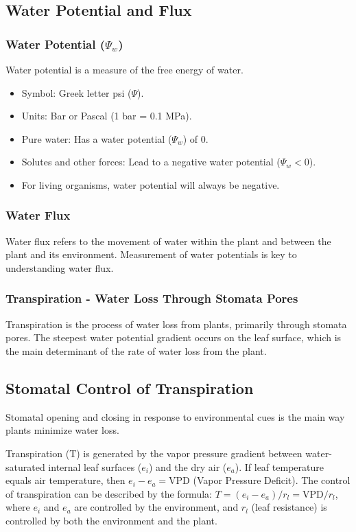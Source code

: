 \subsection{Water Potential and Flux} 
\subsubsection{Water Potential ($\Psi_w$)} 
Water potential is a measure of the free energy of water. 
\begin{itemize} 
    \item Symbol: Greek letter psi ($\Psi$). 
    \item Units: Bar or Pascal (1 bar = 0.1 MPa). 
    \item Pure water: Has a water potential ($\Psi_w$) of 0. 
    \item Solutes and other forces: Lead to a negative water potential ($\Psi_w < 0$). \item For living organisms, water potential will always be negative. 
\end{itemize}
\subsubsection{Water Flux} Water flux refers to the movement of water within the plant and between the plant and its environment. Measurement of water potentials is key to understanding water flux.

\subsubsection{Transpiration - Water Loss Through Stomata Pores} 
Transpiration is the process of water loss from plants, primarily through stomata pores. The steepest water potential gradient occurs on the leaf surface, which is the main determinant of the rate of water loss from the plant.

\subsection{Stomatal Control of Transpiration} 
Stomatal opening and closing in response to environmental cues is the main way plants minimize water loss. 

\vspace*{1em}
Transpiration (T) is generated by the vapor pressure gradient between water-saturated internal leaf surfaces ($e_i$) and the dry air ($e_a$). If leaf temperature equals air temperature, then $e_i - e_a = \text{VPD}$ (Vapor Pressure Deficit). The control of transpiration can be described by the formula: $T = (e_i - e_a)/r_l = \text{VPD}/r_l$, where $e_i$ and $e_a$ are controlled by the environment, and $r_l$ (leaf resistance) is controlled by both the environment and the plant.

